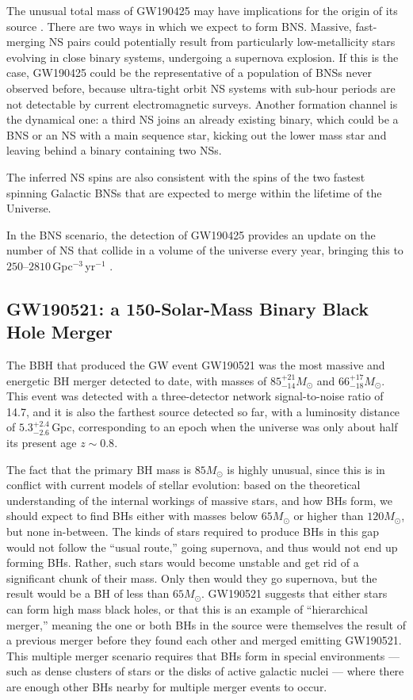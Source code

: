 \documentclass[binding=0.6cm, LaM]{sapthesis}
\begin{document}
	The unusual total mass of GW190425 may have implications for the origin of its source \cite{175}.
	There are two ways in which we expect to form BNS. 
	Massive, fast-merging NS pairs could potentially result from 
	particularly low-metallicity stars evolving in close binary systems, undergoing a supernova explosion.
	If this is the case, GW190425 could be the representative of a population of BNSs never observed before, 
	because ultra-tight orbit NS systems with sub-hour periods are not detectable by current electromagnetic surveys.
	Another formation channel is the dynamical one: a third NS joins an already existing binary, 
	which could be a BNS or an NS with a main sequence star, kicking out the
	lower mass star and leaving behind a binary containing two NSs.

	The inferred NS spins are also consistent with the spins of the two fastest 
	spinning Galactic BNSs that are expected to merge within the lifetime of the Universe.

	In the BNS scenario, the detection of GW190425 provides an update 
	on the number of NS that collide in a volume of the universe every year, bringing this to $250$--$2810\,$Gpc$^{-3}\,$yr$^{-1}$ \cite{62}.

\subsection{GW190521: a 150-Solar-Mass Binary Black Hole Merger}
	The BBH that produced the GW event GW190521 was the most massive and energetic BH merger detected to date, 
	with masses of $85^{+21}_{-14}M_{\odot}$ and $66^{+17}_{-18}M_{\odot}$.
	This event was detected with a three-detector network signal-to-noise ratio of 14.7, 
	and it is also the farthest source detected so far, with a luminosity distance of $5.3^{+2.4}_{-2.6}\,$Gpc,
	corresponding to an epoch when the universe was only about half its present age $z \sim 0.8$.

	The fact that the primary BH mass is $85 M_{\odot}$ is highly unusual, 
	since this is in conflict with current models of stellar evolution:
	based on the theoretical understanding of the internal workings of massive stars, 
	and how BHs form, we should expect to find BHs
	either with masses below $65M_\odot$ or higher than $120M_{\odot}$, but none in-between.
	The kinds of stars required to produce BHs in this gap would not follow the ``usual route,''
	going supernova, and thus would not end up forming BHs. 
	Rather, such stars would become unstable and get rid of a significant chunk of their mass. 
	Only then would they go supernova, but the result would be a BH of less than $65 M_\odot$.
	GW190521 suggests that either stars can form high mass black holes, 
	or that this is an example of ``hierarchical merger,'' 
	meaning the one or both BHs in the source were themselves the result of 
	a previous merger before they found each other and merged emitting GW190521.
	This multiple merger scenario requires that BHs form in special environments
        --- such as dense clusters of stars or the disks of active galactic nuclei --- 
	where there are enough other BHs nearby for multiple merger events to occur.
\end{document}
